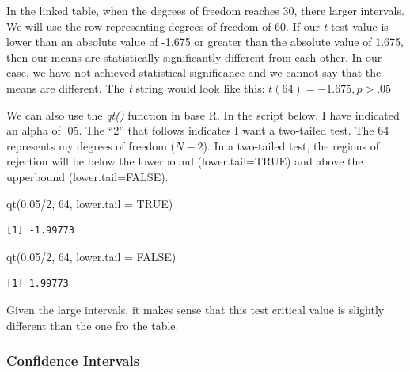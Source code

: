 \documentclass[
  11pt,
]{book}
\newenvironment{Shaded}{\begin{snugshade}}{\end{snugshade}}
\newcommand{\AttributeTok}[1]{\textcolor[rgb]{0.77,0.63,0.00}{#1}}
\newcommand{\ConstantTok}[1]{\textcolor[rgb]{0.00,0.00,0.00}{#1}}
\newcommand{\DecValTok}[1]{\textcolor[rgb]{0.00,0.00,0.81}{#1}}
\newcommand{\FloatTok}[1]{\textcolor[rgb]{0.00,0.00,0.81}{#1}}
\newcommand{\FunctionTok}[1]{\textcolor[rgb]{0.00,0.00,0.00}{#1}}
\newcommand{\NormalTok}[1]{#1}
\newcommand{\SpecialCharTok}[1]{\textcolor[rgb]{0.00,0.00,0.00}{#1}}
\begin{document}
In the linked table, when the degrees of freedom reaches 30, there larger intervals. We will use the row representing degrees of freedom of 60. If our \emph{t} test value is lower than an absolute value of -1.675 or greater than the absolute value of 1.675, then our means are statistically significantly different from each other. In our case, we have not achieved statistical significance and we cannot say that the means are different. The \emph{t} string would look like this: \(t(64) = -1.675, p > .05\)

We can also use the \emph{qt()} function in base R. In the script below, I have indicated an alpha of .05. The ``2'' that follows indicates I want a two-tailed test. The 64 represents my degrees of freedom (\(N-2\)). In a two-tailed test, the regions of rejection will be below the lowerbound (lower.tail=TRUE) and above the upperbound (lower.tail=FALSE).

\begin{Shaded}
\begin{Highlighting}[]
\FunctionTok{qt}\NormalTok{(}\FloatTok{0.05}\SpecialCharTok{/}\DecValTok{2}\NormalTok{, }\DecValTok{64}\NormalTok{, }\AttributeTok{lower.tail =} \ConstantTok{TRUE}\NormalTok{)}
\end{Highlighting}
\end{Shaded}

\begin{verbatim}
[1] -1.99773
\end{verbatim}

\begin{Shaded}
\begin{Highlighting}[]
\FunctionTok{qt}\NormalTok{(}\FloatTok{0.05}\SpecialCharTok{/}\DecValTok{2}\NormalTok{, }\DecValTok{64}\NormalTok{, }\AttributeTok{lower.tail =} \ConstantTok{FALSE}\NormalTok{)}
\end{Highlighting}
\end{Shaded}

\begin{verbatim}
[1] 1.99773
\end{verbatim}

Given the large intervals, it makes sense that this test critical value is slightly different than the one fro the table.

\hypertarget{confidence-intervals-1}{%
\subsubsection{Confidence Intervals}\label{confidence-intervals-1}}
\end{document}
